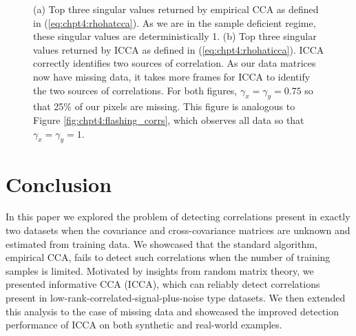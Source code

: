 \begin{figure}
  \begin{center}
    \caption{(a) Top three singular values returned by empirical CCA as defined in
      (\ref{eq:chpt4:rhohatcca}). As we are in the sample deficient regime, these singular
      values are deterministically 1. (b) Top three singular values returned by ICCA as
      defined in (\ref{eq:chpt4:rhohaticca}). ICCA correctly identifies two sources of
      correlation. As our data matrices now have missing data, it takes more frames for
      ICCA to identify the two sources of correlations. For both figures,
      $\gamma_x=\gamma_y=0.75$ so that 25\% of our pixels are missing. This figure is
      analogous to Figure \ref{fig:chpt4:flashing_corrs}, which observes all data so that
      $\gamma_x=\gamma_y=1$.}
    \label{fig:chpt4:flashing_corrs_miss}
  \end{center}
\end{figure}

\section{Conclusion}\label{sec:chpt4:concl}

In this paper we explored the problem of detecting correlations present in exactly two
datasets when the covariance and cross-covariance matrices are unknown and estimated from
training data. We showcased that the standard algorithm, empirical CCA, fails to detect
such correlations when the number of training samples is limited. Motivated by insights
from random matrix theory, we presented informative CCA (ICCA), which can reliably detect
correlations present in low-rank-correlated-signal-plus-noise type datasets. We then
extended this analysis to the case of missing data and showcased the improved detection
performance of ICCA on both synthetic and real-world examples. 

